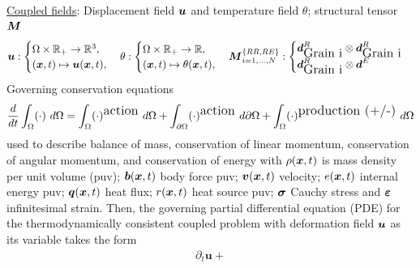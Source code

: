 \documentclass[25pt, a0paper,
portrait,
margin=2mm, 
innermargin=2mm, 
blockverticalspace=7mm, %
colspace=2mm, %
subcolspace=0mm]{tikzposter}
\begin{document}
{
	\begin{minipage}{0.43\textwidth}
		\begin{mdframed}
			\underline{Coupled fields}: 
			Displacement field ${\boldsymbol{\mathnormal u}}$ and temperature field $\theta$; 
			structural tensor ${\boldsymbol{\mathnormal M}}$
			\begin{align*}
				\Bu:
				\begin{cases}
					\Omega \times \mathbb{R}_{+} \rightarrow \mathbb{R}^3, \\
					(\Bx,t) \mapsto \Bu(\Bx,t),
				\end{cases}
				\theta:
				\begin{cases}
					\Omega \times \mathbb{R}_{+} \rightarrow \mathbb{R}, \\
					(\Bx,t) \mapsto \theta(\Bx,t),
				\end{cases}
				\BM^{\{RR,RE\}}_{i=1,\dots,N}:
				\begin{cases}
					\Bd^{R}_{\text{\tiny Grain i}} \otimes \Bd^{R}_{\text{\tiny Grain i}} 
					\\
					\Bd^{R}_{\text{\tiny Grain i}} \otimes \Bd^{E}
				\end{cases}
			\end{align*}
			Governing conservation equations
			\begin{align*}
				\frac{d}{dt} \int_{\Omega}(\cdot)\ d\Omega = \int_{\Omega}(\cdot)^{\text{\tiny action}}\ d\Omega 
				+ \int_{\partial\Omega}(\cdot)^{\text{\tiny action}}\ d\partial\Omega  
				+ \int_{\Omega}(\cdot)^{\text{\tiny production (+/-)}}\ d\Omega
			\end{align*}
			used to describe balance of mass, 
			conservation of linear momentum, 
			conservation of angular momentum,
			and conservation of energy
			with
			$\rho({\boldsymbol{\mathnormal x}},t)$ is mass density per unit volume (puv); 
			${\boldsymbol{\mathnormal b}}({\boldsymbol{\mathnormal x}},t)$ body force puv; 
			${\boldsymbol{\mathnormal v}}({\boldsymbol{\mathnormal x}},t)$ velocity; 
			$e({\boldsymbol{\mathnormal x}},t)$ internal energy puv; 
			${\boldsymbol{\mathnormal q}}({\boldsymbol{\mathnormal x}},t)$ heat flux; 
			$r({\boldsymbol{\mathnormal x}},t)$ heat source puv; 
			${\boldsymbol{\sigma}}$ Cauchy stress and 
			${\boldsymbol{\varepsilon}}$ infinitesimal strain.
			Then, the governing partial differential equation (PDE) 
			for the thermodynamically consistent coupled problem
			with deformation field ${\boldsymbol{\mathnormal u}}$ as its variable
			takes the form
			\begin{align*}
				\partial_{t}\bm{u}
				+

\end{align*}
\end{mdframed}
\end{minipage}}
\end{document}
